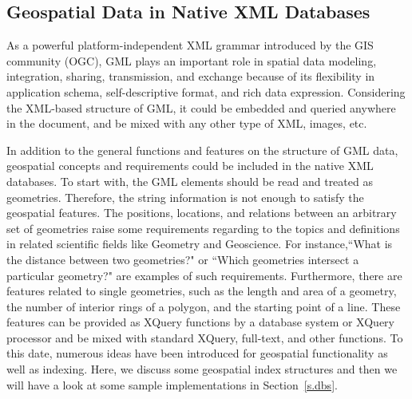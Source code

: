 \documentclass[a4paper,12pt]{article}
\begin{document}
\subsection{Geospatial Data in Native XML Databases}
\label{s.geo-data-in-xml-data}
As a powerful platform-independent XML grammar introduced by the GIS community (OGC), GML plays an important role in spatial data modeling, integration, sharing, transmission, and exchange because of its flexibility in application schema, self-descriptive format, and rich data expression. Considering the XML-based structure of GML, it could be embedded and queried anywhere in the document, and be mixed with any other type of XML, images, etc. 

In addition to the general functions and features on the structure of GML data, geospatial concepts and requirements could be included in the native XML databases. To start with, the GML elements should be read and treated as geo\-metries. Therefore, the string information is not enough to satisfy the geospatial features. The positions, locations, and relations between an arbitrary set of geo\-metries raise some requirements regarding to the topics and definitions in related scientific fields like Geometry and Geoscience. For instance,``What is the distance between two geometries?" or ``Which geometries intersect a particular geometry?" are examples of such requirements. Furthermore, there are features related to single geometries, such as the length and area of a geometry, the number of interior rings of a polygon, and the starting point of a line. These features can be provided as XQuery functions by a database system or XQuery processor and be mixed with standard XQuery, full-text, and other functions.
To this date, numerous ideas have been introduced for geospatial functionality as well as indexing. Here, we discuss some geospatial index structures and then we will have a look at some sample implementations in Section~\ref{s.dbs}.

\end{document}
